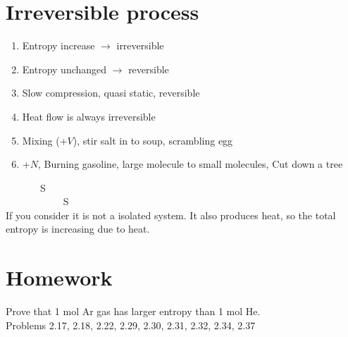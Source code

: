\section{Irreversible process}
\begin{enumerate}
\item Entropy increase $\rightarrow$ irreversible
\item Entropy unchanged $\rightarrow$ reversible
\item Slow compression, quasi static, reversible
\item Heat flow is always irreversible
\item Mixing (+$V$), stir salt in to soup, scrambling egg
\item +$N$, Burning gasoline, large molecule to small molecules, Cut down a tree
\end{enumerate}

 ~~~~~~~S\\
~~~~~~~~~~~ S\\
If you consider it is not a isolated system. It also produces heat, so the total entropy is increasing due to heat.

\section{Homework}
Prove that 1 mol Ar gas has larger entropy than 1 mol He.\\
Problems 2.17, 2.18, 2.22, 2.29, 2.30, 2.31, 2.32, 2.34, 2.37


